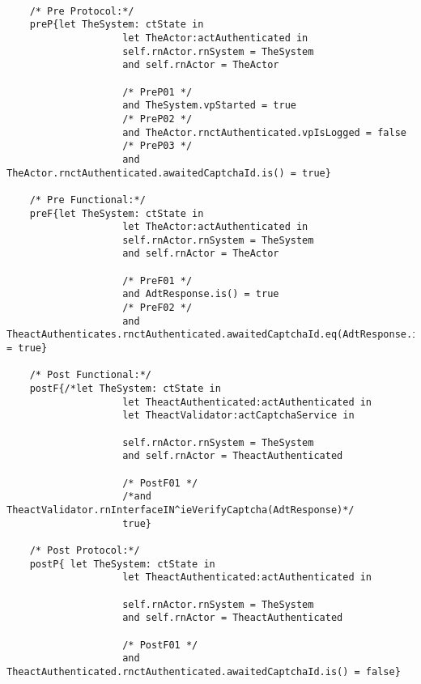 	\scriptsize
	\vspace{0.5cm}
	\begin{lstlisting}[style=MessirStyle,firstnumber=auto,captionpos=b,caption={\msrmessir (MCL-oriented) specification of the operation \emph{oeSubmitCaptcha}.},label=OM-actAuthenticated-oeSubmitCaptcha-MCL-LST]

	/* Pre Protocol:*/ 
	preP{let TheSystem: ctState in
					let TheActor:actAuthenticated in
					self.rnActor.rnSystem = TheSystem
					and self.rnActor = TheActor
	  
					/* PreP01 */
					and TheSystem.vpStarted = true
					/* PreP02 */
					and TheActor.rnctAuthenticated.vpIsLogged = false
					/* PreP03 */
					and TheActor.rnctAuthenticated.awaitedCaptchaId.is() = true}
	
	/* Pre Functional:*/
	preF{let TheSystem: ctState in
					let TheActor:actAuthenticated in
					self.rnActor.rnSystem = TheSystem
					and self.rnActor = TheActor
					
					/* PreF01 */
					and AdtResponse.is() = true
					/* PreF02 */
					and TheactAuthenticates.rnctAuthenticated.awaitedCaptchaId.eq(AdtResponse.id) = true}
	
	/* Post Functional:*/ 
	postF{/*let TheSystem: ctState in
					let TheactAuthenticated:actAuthenticated in
					let TheactValidator:actCaptchaService in
	  
					self.rnActor.rnSystem = TheSystem
					and self.rnActor = TheactAuthenticated
					
					/* PostF01 */
					/*and TheactValidator.rnInterfaceIN^ieVerifyCaptcha(AdtResponse)*/
	           		true}
	
	/* Post Protocol:*/ 
	postP{ let TheSystem: ctState in
					let TheactAuthenticated:actAuthenticated in
	  
					self.rnActor.rnSystem = TheSystem
					and self.rnActor = TheactAuthenticated
					
					/* PostF01 */
					and TheactAuthenticated.rnctAuthenticated.awaitedCaptchaId.is() = false}
	
	\end{lstlisting}
	\normalsize 
	
	
	
	





